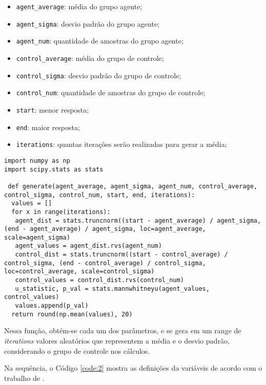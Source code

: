 \documentclass[12pt]{article}
\begin{document}
\begin{itemize}
	\item \texttt{agent\_average}: média do grupo agente;
	\item \texttt{agent\_sigma}: desvio padrão do grupo agente;
	\item \texttt{agent\_num}: quantidade de amostras do grupo agente;
	\item \texttt{control\_average}: média do grupo de controle;
	\item \texttt{control\_sigma}: desvio padrão do grupo de controle;
	\item \texttt{control\_num}: quantidade de amostras do grupo de controle;
	\item \texttt{start}: menor resposta;
	\item \texttt{end}: maior resposta;
	\item \texttt{iterations}: quantas iterações serão realizadas para gerar a média;
\end{itemize}

\begin{lstlisting}[caption={Definição da Função Genérica},captionpos=b,frame=single,label={code:1}]
import numpy as np
import scipy.stats as stats
 
 def generate(agent_average, agent_sigma, agent_num, control_average, control_sigma, control_num, start, end, iterations):
  values = []
  for x in range(iterations):
   agent_dist = stats.truncnorm((start - agent_average) / agent_sigma, (end - agent_average) / agent_sigma, loc=agent_average, scale=agent_sigma)
   agent_values = agent_dist.rvs(agent_num)
   control_dist = stats.truncnorm((start - control_average) / control_sigma, (end - control_average) / control_sigma, loc=control_average, scale=control_sigma)
   control_values = control_dist.rvs(control_num)
   u_statistic, p_val = stats.mannwhitneyu(agent_values, control_values)
   values.append(p_val)
  return round(np.mean(values), 20)
\end{lstlisting}

Nessa função, obtém-se cada um dos parâmetros, e se gera em um range de \textit{iterations} valores aleatórios que representem a média e o desvio padrão, considerando o grupo de controle nos cálculos.

Na sequência, o Código \ref{code:2} mostra as definições da variáveis de acordo com o trabalho de \cite{JIN2013248}.
\end{document}
